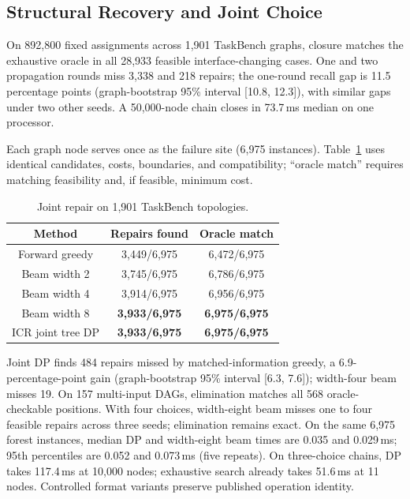 \subsection{Structural Recovery and Joint Choice}
On 892,800 fixed assignments across 1,901 TaskBench graphs, closure matches
the exhaustive oracle in all 28,933 feasible interface-changing cases. One
and two propagation rounds miss 3,338 and 218 repairs; the one-round recall
gap is 11.5 percentage points (graph-bootstrap 95\% interval [10.8, 12.3]),
with similar gaps under two other seeds. A 50,000-node chain closes in
73.7\,ms median on one processor.

Each graph node serves once as the failure site (6,975 instances).
Table~\ref{tab:joint-choice}
uses identical candidates, costs, boundaries, and compatibility; ``oracle match''
requires matching feasibility and, if feasible, minimum cost.
\begin{table}[t]\centering\small\setlength{\tabcolsep}{4pt}
\caption{Joint repair on 1,901 TaskBench topologies.}
\label{tab:joint-choice}
\begin{tabular}{ccc}\toprule
\textbf{Method} & \textbf{Repairs found} & \textbf{Oracle match}\\\midrule
Forward greedy & 3,449/6,975 & 6,472/6,975\\
Beam width 2 & 3,745/6,975 & 6,786/6,975\\
Beam width 4 & 3,914/6,975 & 6,956/6,975\\
Beam width 8 & \textbf{3,933/6,975} & \textbf{6,975/6,975}\\
ICR joint tree DP & \textbf{3,933/6,975} & \textbf{6,975/6,975}\\
\bottomrule\end{tabular}\end{table}

Joint DP finds 484 repairs missed by matched-information greedy, a
6.9-percentage-point gain (graph-bootstrap 95\% interval [6.3, 7.6]); width-four
beam misses 19. On 157 multi-input DAGs, elimination matches all 568
oracle-checkable positions. With four choices, width-eight beam misses one to
four feasible repairs across three seeds; elimination remains exact. On the
same 6,975 forest instances, median DP and width-eight beam times are 0.035
and 0.029\,ms; 95th percentiles are 0.052 and 0.073\,ms (five repeats).
On three-choice chains, DP takes 117.4\,ms at 10,000 nodes; exhaustive search
already takes 51.6\,ms at 11 nodes. Controlled format variants preserve
published operation identity.


